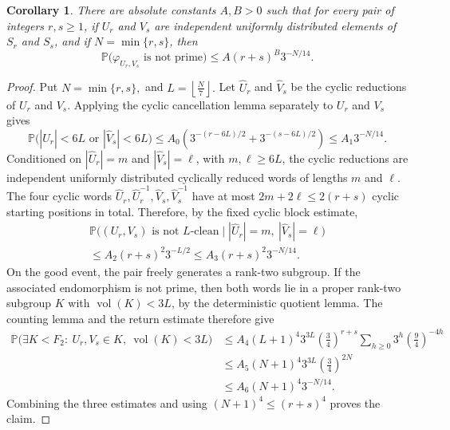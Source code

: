 \documentclass{amsproc}
\newtheorem{corollary}[theorem]{Corollary}
\newcommand{\vol}{\operatorname{vol}}
\newcommand{\Prob}{\mathbb P}
\begin{document}
\begin{corollary}\label{C.mixed-spheres}\label{cor:mixed-sphere}
There are absolute constants $A,B>0$ such that for every pair of integers
$r,s\geq 1$, if $U_r$ and $V_s$ are independent uniformly distributed elements
of $S_r$ and $S_s$, and if $N=\min\{r,s\}$, then
\[
        \Prob\bigl(\varphi_{U_r,V_s}\text{ is not prime}\bigr)
        \leq A(r+s)^B 3^{-N/14}.
\]
\end{corollary}

\begin{proof}
Put
$
        N=\min\{r,s\},$ and $
        L=\left\lfloor\frac N7\right\rfloor.
$
Let $\widehat U_r$ and
$\widehat V_s$ be the cyclic reductions of $U_r$ and $V_s$.  Applying the cyclic
cancellation lemma separately to $U_r$ and $V_s$ gives
\[
        \Prob\bigl(|\widehat U_r|<6L\text{ or }|\widehat V_s|<6L\bigr)
        \leq A_0\left(3^{-(r-6L)/2}+3^{-(s-6L)/2}\right)
        \leq A_1 3^{-N/14}.
\]
Conditioned on $|\widehat U_r|=m$ and $|\widehat V_s|=\ell$, with $m,\ell\geq 6L$,
the cyclic reductions are independent uniformly distributed cyclically reduced
words of lengths $m$ and $\ell$.  The four cyclic words
$\widehat U_r,\widehat U_r^{-1},\widehat V_s,\widehat V_s^{-1}$ have at most
$2m+2\ell\leq 2(r+s)$ cyclic starting positions in total.  Therefore, by the
fixed cyclic block estimate,
\begin{multline*}
        \Prob\bigl((U_r,V_s)\text{ is not }L\text{-clean}
        \mid |\widehat U_r|=m,\ |\widehat V_s|=\ell\bigr) \\
        \leq A_2 (r+s)^2 3^{-L/2}
        \leq A_3 (r+s)^2 3^{-N/14}.
\end{multline*}
On the good event, the pair freely generates a rank-two subgroup.  If the
associated endomorphism is not prime, then both words lie in a proper rank-two
subgroup $K$ with $\vol(K)<3L$, by the deterministic quotient lemma.  The
counting lemma and the return estimate therefore give
\[
\begin{aligned}
        \Prob\bigl(\exists K<F_2:\ U_r,V_s\in K,\ \vol(K)<3L\bigr)
        &\leq A_4 (L+1)^4 3^{3L} \left(\frac34\right)^{r+s}
        \sum_{h\geq 0} 3^h\left(\frac94\right)^{-4h} \\
        &\leq A_5 (N+1)^4 3^{3L} \left(\frac34\right)^{2N} \\
        &\leq A_6 (N+1)^4 3^{-N/14}.
\end{aligned}
\]
Combining the three estimates and using $(N+1)^4\leq (r+s)^4$ proves the claim.
\end{proof}
\end{document}
